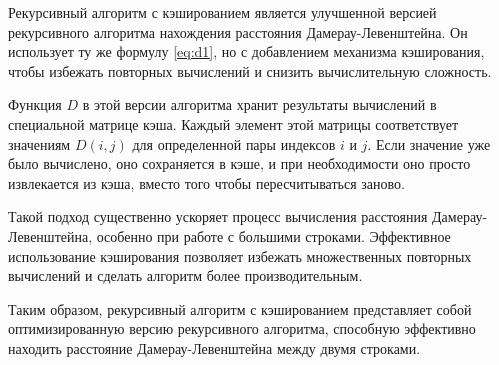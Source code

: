 Рекурсивный алгоритм с кэшированием является улучшенной версией рекурсивного алгоритма нахождения расстояния Дамерау-Левенштейна. Он использует ту же формулу \ref{eq:d1}, но с добавлением механизма кэширования, чтобы избежать повторных вычислений и снизить вычислительную сложность.

Функция $D$ в этой версии алгоритма хранит результаты вычислений в специальной матрице кэша. Каждый элемент этой матрицы соответствует значениям $D(i, j)$ для определенной пары индексов $i$ и $j$. Если значение уже было вычислено, оно сохраняется в кэше, и при необходимости оно просто извлекается из кэша, вместо того чтобы пересчитываться заново.

Такой подход существенно ускоряет процесс вычисления расстояния Дамерау-Левенштейна, особенно при работе с большими строками. Эффективное использование кэширования позволяет избежать множественных повторных вычислений и сделать алгоритм более производительным.

Таким образом, рекурсивный алгоритм с кэшированием представляет собой оптимизированную версию рекурсивного алгоритма, способную эффективно находить расстояние Дамерау-Левенштейна между двумя строками.
